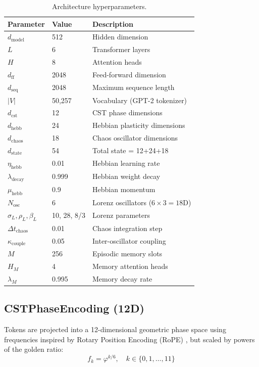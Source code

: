 \documentclass[11pt,a4paper]{article}
\begin{document}
\begin{table}[h]
\centering
\caption{Architecture hyperparameters.}
\label{tab:config}
\begin{tabular}{lll}
\toprule
\textbf{Parameter} & \textbf{Value} & \textbf{Description} \\
\midrule
$d_{\text{model}}$ & 512 & Hidden dimension \\
$L$ & 6 & Transformer layers \\
$H$ & 8 & Attention heads \\
$d_{\text{ff}}$ & 2048 & Feed-forward dimension \\
$d_{\text{seq}}$ & 2048 & Maximum sequence length \\
$|V|$ & 50{,}257 & Vocabulary (GPT-2 tokenizer) \\
\midrule
$d_{\text{cst}}$ & 12 & CST phase dimensions \\
$d_{\text{hebb}}$ & 24 & Hebbian plasticity dimensions \\
$d_{\text{chaos}}$ & 18 & Chaos oscillator dimensions \\
$d_{\text{state}}$ & 54 & Total state = 12+24+18 \\
\midrule
$\eta_{\text{hebb}}$ & 0.01 & Hebbian learning rate \\
$\lambda_{\text{decay}}$ & 0.999 & Hebbian weight decay \\
$\mu_{\text{hebb}}$ & 0.9 & Hebbian momentum \\
\midrule
$N_{\text{osc}}$ & 6 & Lorenz oscillators ($6 \times 3 = 18$D) \\
$\sigma_L, \rho_L, \beta_L$ & 10, 28, 8/3 & Lorenz parameters \\
$\Delta t_{\text{chaos}}$ & 0.01 & Chaos integration step \\
$\kappa_{\text{couple}}$ & 0.05 & Inter-oscillator coupling \\
\midrule
$M$ & 256 & Episodic memory slots \\
$H_M$ & 4 & Memory attention heads \\
$\lambda_M$ & 0.995 & Memory decay rate \\
\bottomrule
\end{tabular}
\end{table}

\subsection{CSTPhaseEncoding (12D)}
\label{sec:cst-encoding}

Tokens are projected into a 12-dimensional geometric phase space using frequencies inspired by Rotary Position Encoding (RoPE) \citep{su2024roformer}, but scaled by powers of the golden ratio:
\begin{equation}
    f_k = \varphi^{k/6}, \quad k \in \{0, 1, \ldots, 11\}
    \label{eq:phase-freq}
\end{equation}
\end{document}
